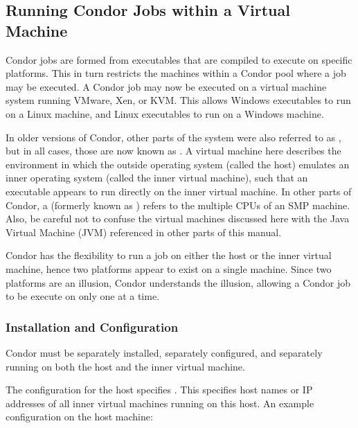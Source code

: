\subsection{\label{sec:Virtual-Machines}
Running Condor Jobs within a Virtual Machine}

Condor jobs are formed from executables that are compiled to execute
on specific platforms.
This in turn restricts the machines within a Condor pool where
a job may be executed.
A Condor job may now be executed on a 
virtual machine system running VMware, Xen, or KVM.
This allows Windows executables to run on a Linux machine,
and Linux executables to run on a Windows machine.

In older versions of Condor, other parts of the system were also
referred to as , but in all cases, those are now
known as .
A virtual machine here describes the environment in which
the outside operating system (called the host) emulates an inner operating
system (called the inner virtual machine),
such that an executable appears to run directly
on the inner virtual machine.
In other parts of Condor, a  (formerly known as
) refers to the multiple CPUs of an SMP
machine.
Also, be careful not to confuse the virtual machines discussed here
with the Java Virtual Machine (JVM) referenced in other parts of this
manual.

Condor has the flexibility to run a job on either the host
or the inner virtual machine, 
hence two platforms appear to exist on a single machine.
Since two platforms are an illusion, Condor understands the illusion, 
allowing a Condor job to be execute on only
one at a time.

\subsubsection{\label{sec:Virtual-Machines-Configuration}
Installation and Configuration}

Condor must be separately installed, separately configured,
and separately running on both
the host and the inner virtual machine.

The configuration for the host specifies .
This specifies host names or IP addresses of all inner virtual machines
running on this host.
An example configuration on the host machine:

